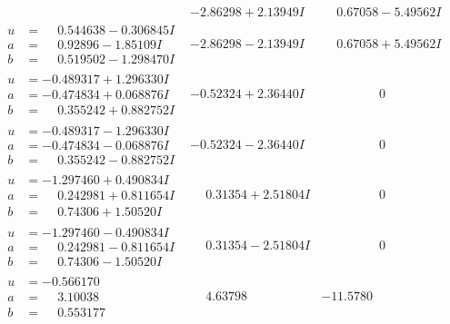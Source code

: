 \documentclass[1p]{elsarticle_modified}
\theoremstyle{definition}
\begin{document}
$$\begin{array}{c|c|c}
 & -2.86298 + 2.13949 I & \phantom{-}0.67058 - 5.49562 I \\ \hline\begin{aligned}
u &= \phantom{-}0.544638 - 0.306845 I \\
a &= \phantom{-}0.92896 - 1.85109 I \\
b &= \phantom{-}0.519502 - 1.298470 I\end{aligned}
 & -2.86298 - 2.13949 I & \phantom{-}0.67058 + 5.49562 I \\ \hline\begin{aligned}
u &= -0.489317 + 1.296330 I \\
a &= -0.474834 + 0.068876 I \\
b &= \phantom{-}0.355242 + 0.882752 I\end{aligned}
 & -0.52324 + 2.36440 I & \phantom{-0.000000 } 0 \\ \hline\begin{aligned}
u &= -0.489317 - 1.296330 I \\
a &= -0.474834 - 0.068876 I \\
b &= \phantom{-}0.355242 - 0.882752 I\end{aligned}
 & -0.52324 - 2.36440 I & \phantom{-0.000000 } 0 \\ \hline\begin{aligned}
u &= -1.297460 + 0.490834 I \\
a &= \phantom{-}0.242981 + 0.811654 I \\
b &= \phantom{-}0.74306 + 1.50520 I\end{aligned}
 & \phantom{-}0.31354 + 2.51804 I & \phantom{-0.000000 } 0 \\ \hline\begin{aligned}
u &= -1.297460 - 0.490834 I \\
a &= \phantom{-}0.242981 - 0.811654 I \\
b &= \phantom{-}0.74306 - 1.50520 I\end{aligned}
 & \phantom{-}0.31354 - 2.51804 I & \phantom{-0.000000 } 0 \\ \hline\begin{aligned}
u &= -0.566170\phantom{ +0.000000I} \\
a &= \phantom{-}3.10038\phantom{ +0.000000I} \\
b &= \phantom{-}0.553177\phantom{ +0.000000I}\end{aligned}
 & \phantom{-}4.63798\phantom{ +0.000000I} & -11.5780\phantom{ +0.000000I} \\ \hline\begin{aligned}

\end{aligned}
\end{array}$$
\end{document}
